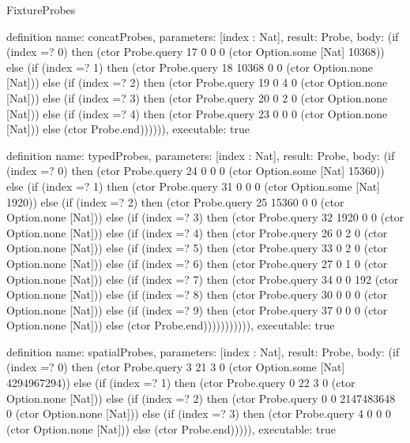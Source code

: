 \begin{lexlean}{FixtureProbes}
\begin{semanticmodule}
definition{
  name: concatProbes,
  parameters: [index : Nat],
  result: Probe,
  body: (if (index =? 0) then (ctor Probe.query 17 0 0 0 (ctor Option.some [Nat] 10368)) else (if (index =? 1) then (ctor Probe.query 18 10368 0 0 (ctor Option.none [Nat])) else (if (index =? 2) then (ctor Probe.query 19 0 4 0 (ctor Option.none [Nat])) else (if (index =? 3) then (ctor Probe.query 20 0 2 0 (ctor Option.none [Nat])) else (if (index =? 4) then (ctor Probe.query 23 0 0 0 (ctor Option.none [Nat])) else (ctor Probe.end)))))),
  executable: true
}

definition{
  name: typedProbes,
  parameters: [index : Nat],
  result: Probe,
  body: (if (index =? 0) then (ctor Probe.query 24 0 0 0 (ctor Option.some [Nat] 15360)) else (if (index =? 1) then (ctor Probe.query 31 0 0 0 (ctor Option.some [Nat] 1920)) else (if (index =? 2) then (ctor Probe.query 25 15360 0 0 (ctor Option.none [Nat])) else (if (index =? 3) then (ctor Probe.query 32 1920 0 0 (ctor Option.none [Nat])) else (if (index =? 4) then (ctor Probe.query 26 0 2 0 (ctor Option.none [Nat])) else (if (index =? 5) then (ctor Probe.query 33 0 2 0 (ctor Option.none [Nat])) else (if (index =? 6) then (ctor Probe.query 27 0 1 0 (ctor Option.none [Nat])) else (if (index =? 7) then (ctor Probe.query 34 0 0 192 (ctor Option.none [Nat])) else (if (index =? 8) then (ctor Probe.query 30 0 0 0 (ctor Option.none [Nat])) else (if (index =? 9) then (ctor Probe.query 37 0 0 0 (ctor Option.none [Nat])) else (ctor Probe.end))))))))))),
  executable: true
}

definition{
  name: spatialProbes,
  parameters: [index : Nat],
  result: Probe,
  body: (if (index =? 0) then (ctor Probe.query 3 21 3 0 (ctor Option.some [Nat] 4294967294)) else (if (index =? 1) then (ctor Probe.query 0 22 3 0 (ctor Option.none [Nat])) else (if (index =? 2) then (ctor Probe.query 0 0 2147483648 0 (ctor Option.none [Nat])) else (if (index =? 3) then (ctor Probe.query 4 0 0 0 (ctor Option.none [Nat])) else (ctor Probe.end))))),
  executable: true
}


\end{semanticmodule}
\end{lexlean}
